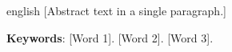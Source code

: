 \begin{resumo}[Abstract]
	\begin{otherlanguage*}{english}
		[Abstract text in a single paragraph.]

		\textbf{Keywords}: [Word 1]. [Word 2]. [Word 3].
	\end{otherlanguage*}
\end{resumo}
